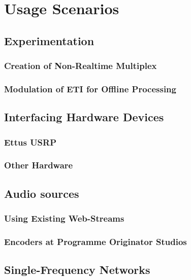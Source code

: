 \section{Usage Scenarios}
\subsection{Experimentation}
\subsubsection{Creation of Non-Realtime Multiplex}
\subsubsection{Modulation of ETI for Offline Processing}

\subsection{Interfacing Hardware Devices}
\subsubsection{Ettus USRP}
\subsubsection{Other Hardware}

\subsection{Audio sources}
\subsubsection{Using Existing Web-Streams}
\subsubsection{Encoders at Programme Originator Studios}

\subsection{Single-Frequency Networks}
